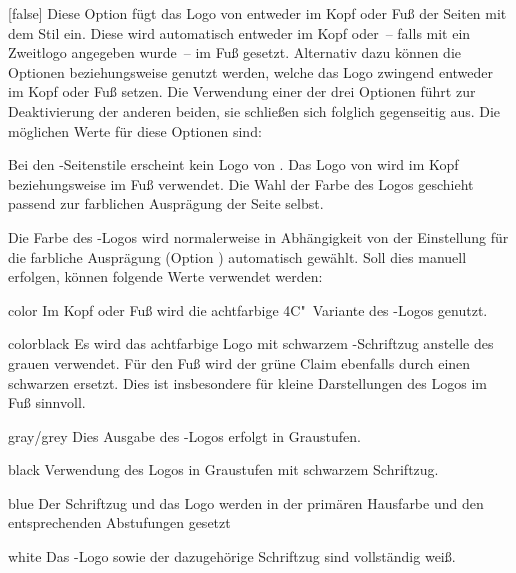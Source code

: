 \begin{Declaration*}{}
\begin{Declaration*}{}
\begin{Declaration*}{}
\begin{Declaration}[%
  v2.02:Logo von \DDC automatisch in Kopf/Fuß;%
  v2.02!\Option{ddc=colorblack};
  v2.02!\Option{ddc=gray};
  v2.02!\Option{ddc=black};
  v2.02!\Option{ddc=blue};
  v2.02!\Option{ddc=white};
]{}[false]
\printdeclarationlist%
%
%
%
%
%
Diese Option fügt das Logo von \DDC entweder im Kopf oder Fuß der Seiten mit 
dem Stil  ein. Diese wird automatisch entweder im Kopf 
oder~-- falls mit  ein Zweitlogo angegeben wurde~-- im Fuß 
gesetzt. Alternativ dazu können die Optionen  beziehungsweise 
 genutzt werden, welche das Logo zwingend entweder im Kopf oder 
Fuß setzen. Die Verwendung einer der drei Optionen führt zur Deaktivierung der 
anderen beiden, sie schließen sich folglich gegenseitig aus. Die möglichen 
Werte für diese Optionen sind:
%
\begin{values}{}
\itemfalse
  Bei den -Seitenstile erscheint kein Logo von \DDC.
\itemtrue*
  Das Logo von \DDC wird im Kopf beziehungsweise im Fuß verwendet. Die Wahl der 
  Farbe des Logos geschieht passend zur farblichen Ausprägung der Seite selbst.
\end{values}
%
Die Farbe des \DDC-Logos wird normalerweise in Abhängigkeit von der Einstellung 
für die farbliche Ausprägung (Option ) automatisch gewählt. 
Soll dies manuell erfolgen, können folgende Werte verwendet werden:
%
\begin{values}{}
\item[color]
  Im Kopf oder Fuß wird die achtfarbige 4C"~Variante des \DDC-Logos genutzt.
\item[colorblack]
  Es wird das achtfarbige Logo mit schwarzem \DDC-Schriftzug anstelle des 
  grauen verwendet. Für den Fuß wird der grüne Claim ebenfalls durch einen 
  schwarzen ersetzt. Dies ist insbesondere für kleine Darstellungen des Logos 
  im Fuß sinnvoll.
\item[gray/grey]
  Dies Ausgabe des \DDC-Logos erfolgt in Graustufen.
\item[black]
  Verwendung des Logos in Graustufen mit schwarzem Schriftzug.
\item[blue]
  Der Schriftzug und das Logo werden in der primären Hausfarbe  
  und den entsprechenden Abstufungen gesetzt
\item[white]
  Das \DDC-Logo sowie der dazugehörige Schriftzug sind vollständig weiß.

\end{values}
\end{Declaration}
\end{Declaration*}
\end{Declaration*}
\end{Declaration*}
